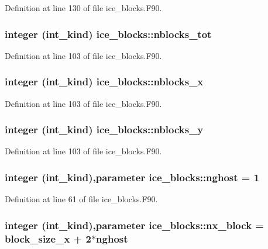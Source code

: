 Definition at line 130 of file ice\_\-blocks.F90.\hypertarget{namespaceice__blocks_a5b80499202c9881a6a1ff8e3375a7079}{
\subsubsection[{nblocks\_\-tot}]{\setlength{\rightskip}{0pt plus 5cm}integer (int\_\-kind) {\bf ice\_\-blocks::nblocks\_\-tot}}}
\label{namespaceice__blocks_a5b80499202c9881a6a1ff8e3375a7079}


Definition at line 103 of file ice\_\-blocks.F90.\hypertarget{namespaceice__blocks_a9b21bc42a54bcb4a87b28e91dcd90868}{
\subsubsection[{nblocks\_\-x}]{\setlength{\rightskip}{0pt plus 5cm}integer (int\_\-kind) {\bf ice\_\-blocks::nblocks\_\-x}}}
\label{namespaceice__blocks_a9b21bc42a54bcb4a87b28e91dcd90868}


Definition at line 103 of file ice\_\-blocks.F90.\hypertarget{namespaceice__blocks_ab17b5f72b3e734e10c8e896fff833b5c}{
\subsubsection[{nblocks\_\-y}]{\setlength{\rightskip}{0pt plus 5cm}integer (int\_\-kind) {\bf ice\_\-blocks::nblocks\_\-y}}}
\label{namespaceice__blocks_ab17b5f72b3e734e10c8e896fff833b5c}


Definition at line 103 of file ice\_\-blocks.F90.\hypertarget{namespaceice__blocks_a75dd0bf2d3d80ac626a1effa70f77a35}{
\subsubsection[{nghost}]{\setlength{\rightskip}{0pt plus 5cm}integer (int\_\-kind),parameter {\bf ice\_\-blocks::nghost} = 1}}
\label{namespaceice__blocks_a75dd0bf2d3d80ac626a1effa70f77a35}


Definition at line 61 of file ice\_\-blocks.F90.\hypertarget{namespaceice__blocks_a130f3f9b102e86de209ee25eb36e44ba}{
\subsubsection[{nx\_\-block}]{\setlength{\rightskip}{0pt plus 5cm}integer (int\_\-kind),parameter {\bf ice\_\-blocks::nx\_\-block} = block\_\-size\_\-x + 2$\ast${\bf nghost}}}
\label{namespaceice__blocks_a130f3f9b102e86de209ee25eb36e44ba}


